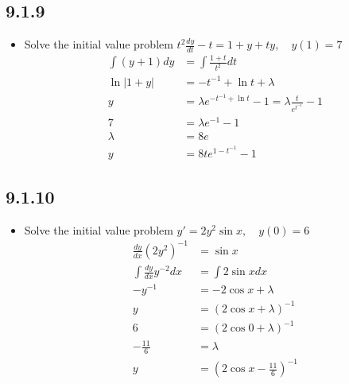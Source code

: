 \begin{itemize}
  \subsection{9.1.9}
  \begin{itemize}
    \item Solve the initial value problem \( t^2 \frac{dy}{dt} - t = 1 + y +
      ty, \quad y(1) = 7 \)
      \begin{align*}
        \int\left( y + 1 \right) dy &= \int\frac{1+t}{t^2}dt \\
        \ln |1+y| &= -t^{-1}+\ln t + \lambda \\
        y &= \lambda e^{-t^{-1} + \ln t} - 1 = \lambda \frac{t}{e^{t^{-1}}} - 1\\
        7 &= \lambda e^{-1} - 1 \\
        \lambda &= 8e \\
        y &= 8te^{1-t^{-1}} - 1
      \end{align*}
  \end{itemize}

  \subsection{9.1.10}
  \begin{itemize}
    \item Solve the initial value problem \( y' = 2y^2 \sin x, \quad y(0)=6 \)
       \begin{align*}
          \frac{dy}{dx}(2y^2)^{-1} &= \sin x \\
          \int \frac{dy}{dx} y^{-2} dx &= \int 2\sin x dx  \\
          -y^{-1} &= -2\cos x + \lambda \\
          y &= (2\cos x + \lambda)^{-1} \\
          6 &= \left( 2\cos 0 + \lambda \right) ^{-1} \\
          -\frac{11}{6} &= \lambda \\
          y &= \left( 2\cos x - \frac{11}{6} \right)^{-1}
       \end{align*}
  \end{itemize}

\end{itemize}
